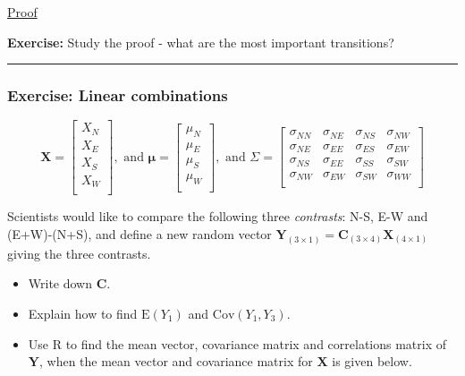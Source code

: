 \documentclass[]{article}
\providecommand{\tightlist}{%
  \setlength{\itemsep}{0pt}\setlength{\parskip}{0pt}}
\begin{document}
\href{https://www.math.ntnu.no/emner/TMA4268/2018v/notes/CXproof.pdf}{Proof}

\textbf{Exercise:} Study the proof - what are the most important
transitions?

\begin{center}\rule{0.5\linewidth}{\linethickness}\end{center}

\hypertarget{exercise-linear-combinations}{%
\subsubsection{Exercise: Linear
combinations}\label{exercise-linear-combinations}}

\[\mathbf{X}=\left[ \begin{array}{c} X_N\\
          X_E\\
X_S\\
          X_W\\
          \end{array}
          \right], \text{ and }
          \mathbf{\mu}=\left[
      \begin{array}{c} \mu_N\\
          \mu_E\\
\mu_S\\
          \mu_W\\
          \end{array}
          \right], \text{ and } \Sigma=\left[ \begin{array}{cccc}
    \sigma_{NN} & \sigma_{NE} & \sigma_{NS} & \sigma_{NW}\\
    \sigma_{NE} & \sigma_{EE} & \sigma_{ES}& \sigma_{EW}\\
        \sigma_{NS} & \sigma_{EE} & \sigma_{SS}& \sigma_{SW}\\
    \sigma_{NW} & \sigma_{EW} & \sigma_{SW} & \sigma_{WW}\\
\end{array} \right]\]

Scientists would like to compare the following three \emph{contrasts}:
N-S, E-W and (E+W)-(N+S), and define a new random vector
\(\mathbf{Y}_{(3\times 1)}=\mathbf{C}_{(3\times 4)} \mathbf{X}_{(4\times 1)}\)
giving the three contrasts.

\begin{itemize}
\tightlist
\item
  Write down \(\mathbf{C}\).
\item
  Explain how to find \(\text{E}(Y_1)\) and \(\text{Cov}(Y_1,Y_3)\).
\item
  Use R to find the mean vector, covariance matrix and correlations
  matrix of \(\mathbf{Y}\), when the mean vector and covariance matrix
  for \(\mathbf{X}\) is given below.
\end{itemize}
\end{document}
